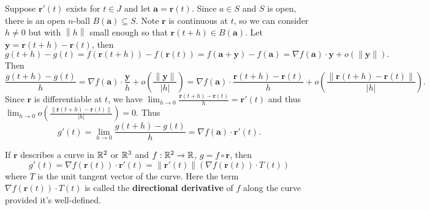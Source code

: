     \begin{proofenv}
        Suppose $\bm r'(t)$ exists for $t\in J$ and let $\bm a = \bm r(t)$. Since $a\in S$ and $S$ is open, there is an open $n$-ball $B(\bm a) \subseteq S$. Note $\bm r$ is continuous at $t$, so we can consider $h\ne 0$ but with $\left\|h\right\|$ small enough so that $\bm r(t+h) \in B(\bm a)$. Let $\bm y = \bm r(t+h) - \bm r(t)$, then
        $$ g(t+h) - g(t) = f(\bm r(t+h)) - f(\bm r(t)) = f(\bm a + \bm y) - f(\bm a) = \nabla f(\bm a) \cdot \bm y + o(\|\bm y\|). $$
        Then
        $$ \frac{g(t+h) - g(t)}{h} = \nabla f(\bm a) \cdot \frac{\bm y}{h} + o\left( \frac{\|\bm y\|}{|h|}\right) = \nabla f(\bm a) \cdot \frac{\bm r(t+h) - \bm r(t)}{h} + o\left( \frac{\|\bm r(t+h) - \bm r(t)\|}{|h|}\right). $$
        Since $\bm r$ is differentiable at $t$, we have $\displaystyle \lim_{h\to 0} \frac{\bm r(t+h) - \bm r(t)}{h} = \bm r'(t)$ and thus $\displaystyle \lim_{h\to 0} o\left( \frac{\|\bm r(t+h) - \bm r(t)\|}{|h|}\right) = 0$. Thus
        $$ g'(t) = \lim_{h\to 0} \frac{g(t+h) - g(t)}{h} = \nabla f(\bm a) \cdot \bm r'(t). $$
    \end{proofenv}
    \begin{exampleenv}
        If $\bm r$ describes a curve in $\mathbb{R}^2$ or $\mathbb{R}^3$ and $f:\mathbb{R}^2 \to \mathbb{R}$, $g=f\circ \bm r$, then
        $$ g'(t) = \nabla f(\bm r(t)) \cdot \bm r'(t) = \left\|\bm r'(t)\right\|\left(\nabla f(\bm r(t)) \cdot T(t)\right) $$
        where $T$ is the unit tangent vector of the curve. Here the term $\nabla f(\bm r(t)) \cdot T(t)$ is called the \textbf{directional derivative} of $f$ along the curve provided it's well-defined.
    \end{exampleenv}

